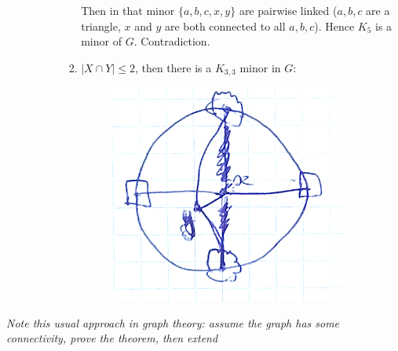 \begin{enumerate}
\begin{enumerate}
\begin{enumerate}
\begin{enumerate}
			Then in that minor $\{ a,b,c,x,y \}$ are pairwise linked ($a,b,c$ are a triangle, $x$ and $y$ are both connected to all $a,b,c$). Hence $K_5$ is a minor of $G$. Contradiction.
									


									\item $|X \cap Y| \leq 2$, then there is a $K_{3,3}$ minor in $G$: 
									\begin{figure}[h]
	\center
	\includegraphics[width=0.3\linewidth]{img/4-4.png}
\end{figure}
								\end{enumerate}
						\end{enumerate} 
				\end{enumerate}
		\end{enumerate}
		
		\textit{Note this usual approach in graph theory: assume the graph has some connectivity, prove the theorem, then extend}
		
